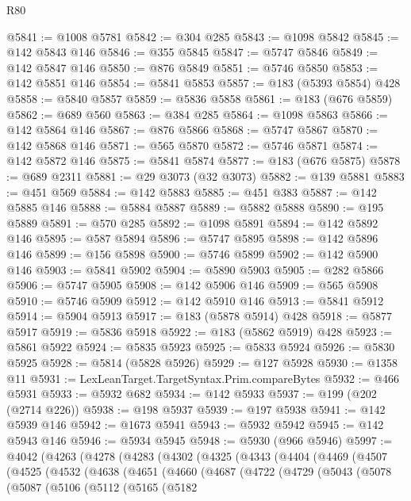 \begin{lexlean}{R80}
\begin{coremodule}
@5841 := @1008 @5781
@5842 := @304 @285
@5843 := @1098 @5842
@5845 := @142 @5843 @146
@5846 := @355 @5845
@5847 := @5747 @5846
@5849 := @142 @5847 @146
@5850 := @876 @5849
@5851 := @5746 @5850
@5853 := @142 @5851 @146
@5854 := @5841 @5853
@5857 := @183 (@5393 @5854) @428
@5858 := @5840 @5857
@5859 := @5836 @5858
@5861 := @183 (@676 @5859)
@5862 := @689 @560
@5863 := @384 @285
@5864 := @1098 @5863
@5866 := @142 @5864 @146
@5867 := @876 @5866
@5868 := @5747 @5867
@5870 := @142 @5868 @146
@5871 := @565 @5870
@5872 := @5746 @5871
@5874 := @142 @5872 @146
@5875 := @5841 @5874
@5877 := @183 (@676 @5875)
@5878 := @689 @2311
@5881 := @29 @3073 (@32 @3073)
@5882 := @139 @5881
@5883 := @451 @569
@5884 := @142 @5883
@5885 := @451 @383
@5887 := @142 @5885 @146
@5888 := @5884 @5887
@5889 := @5882 @5888
@5890 := @195 @5889
@5891 := @570 @285
@5892 := @1098 @5891
@5894 := @142 @5892 @146
@5895 := @587 @5894
@5896 := @5747 @5895
@5898 := @142 @5896 @146
@5899 := @156 @5898
@5900 := @5746 @5899
@5902 := @142 @5900 @146
@5903 := @5841 @5902
@5904 := @5890 @5903
@5905 := @282 @5866
@5906 := @5747 @5905
@5908 := @142 @5906 @146
@5909 := @565 @5908
@5910 := @5746 @5909
@5912 := @142 @5910 @146
@5913 := @5841 @5912
@5914 := @5904 @5913
@5917 := @183 (@5878 @5914) @428
@5918 := @5877 @5917
@5919 := @5836 @5918
@5922 := @183 (@5862 @5919) @428
@5923 := @5861 @5922
@5924 := @5835 @5923
@5925 := @5833 @5924
@5926 := @5830 @5925
@5928 := @5814 (@5828 @5926)
@5929 := @127 @5928
@5930 := @1358 @11
@5931 := LexLeanTarget.TargetSyntax.Prim.compareBytes
@5932 := @466 @5931
@5933 := @5932 @682
@5934 := @142 @5933
@5937 := @199 (@202 (@2714 @226))
@5938 := @198 @5937
@5939 := @197 @5938
@5941 := @142 @5939 @146
@5942 := @1673 @5941
@5943 := @5932 @5942
@5945 := @142 @5943 @146
@5946 := @5934 @5945
@5948 := @5930 (@966 @5946)
@5997 := @4042
    (@4263
      (@4278
        (@4283
          (@4302
            (@4325
              (@4343
                (@4404
                  (@4469
                    (@4507
                      (@4525
                        (@4532
                          (@4638
                            (@4651
                              (@4660
                                (@4687
                                  (@4722
                                    (@4729
                                      (@5043
                                        (@5078
                                          (@5087
                                            (@5106
                                              (@5112
                                                (@5165
                                                  (@5182

\end{coremodule}
\end{lexlean}
